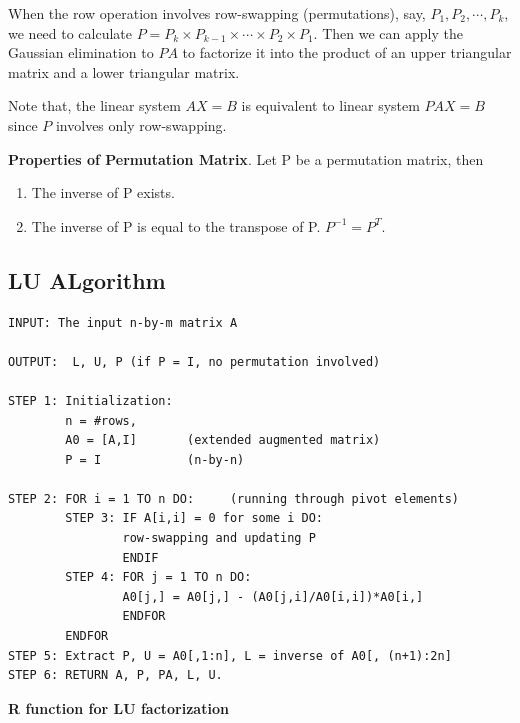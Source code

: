\documentclass[
]{book}
\begin{document}
When the row operation involves row-swapping (permutations), say, \(P_1, P_2, \cdots, P_k\), we need to calculate \(P=P_k\times P_{k-1}\times \cdots \times P_2\times P_1\). Then we can apply the Gaussian elimination to \(PA\) to factorize it into the product of an upper triangular matrix and a lower triangular matrix.

Note that, the linear system \(AX = B\) is equivalent to linear system \(PAX = B\) since \(P\) involves only row-swapping.

\textbf{Properties of Permutation Matrix}. Let P be a permutation matrix, then

\begin{enumerate}
\def\labelenumi{\arabic{enumi}.}
\item
  The inverse of P exists.
\item
  The inverse of P is equal to the transpose of P. \(P^{-1} = P^T\).
\end{enumerate}

\hfill\break

\hypertarget{lu-algorithm}{%
\subsection{LU ALgorithm}\label{lu-algorithm}}

\begin{verbatim}
INPUT: The input n-by-m matrix A

OUTPUT:  L, U, P (if P = I, no permutation involved)

STEP 1: Initialization: 
        n = #rows, 
        A0 = [A,I]       (extended augmented matrix)
        P = I            (n-by-n)

STEP 2: FOR i = 1 TO n DO:     (running through pivot elements)
        STEP 3: IF A[i,i] = 0 for some i DO:
                row-swapping and updating P
                ENDIF
        STEP 4: FOR j = 1 TO n DO:
                A0[j,] = A0[j,] - (A0[j,i]/A0[i,i])*A0[i,]
                ENDFOR
        ENDFOR
STEP 5: Extract P, U = A0[,1:n], L = inverse of A0[, (n+1):2n] 
STEP 6: RETURN A, P, PA, L, U.  
\end{verbatim}

\hfill\break

\textbf{R function for LU factorization}
\end{document}

